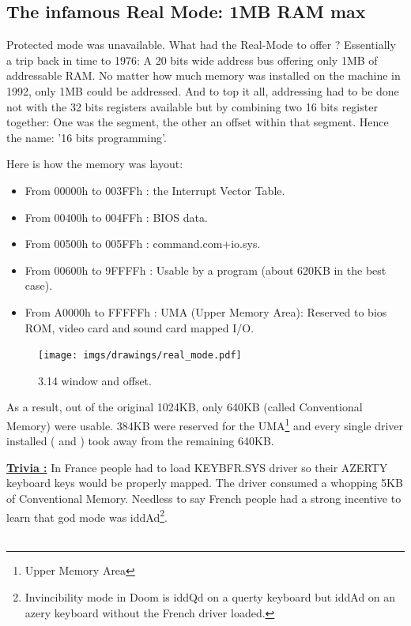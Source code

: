 \documentclass[book.tex]{subfiles}
\begin{document}
  \subsection{The infamous Real Mode: 1MB RAM max}
  Protected mode was unavailable. What had the Real-Mode to offer ? Essentially a trip back in time to 1976: A 20 bits wide address bus offering only 1MB of addressable RAM. No matter how much memory was installed on the machine in 1992, only 1MB could be addressed. And to top it all, addressing had to be done not with the 32 bits registers available but by combining two 16 bits register together: One was the segment, the other an offset within that segment. Hence the name: '16 bits programming'.

  \bigskip
Here is how the memory was layout: \\
\begin{itemize}
\item From 00000h to 003FFh : the Interrupt Vector Table.
\item From 00400h to 004FFh : BIOS data.
\item From 00500h to 005FFh : command.com+io.sys.
\item From 00600h to 9FFFFh : Usable by a program (about 620KB in the best case). 
\item From A0000h to FFFFFh : UMA (Upper Memory Area): Reserved to bios ROM, video card and sound card mapped I/O.
\end{itemize}

\begin{figure}[H]
\centering
\texttt{[image: imgs/drawings/real\_mode.pdf]}

\caption{3.14 window and offset.}
\label{fig:fp_internals}
\end{figure}


As a result, out of the original 1024KB, only 640KB (called Conventional Memory) were usable. 384KB were reserved for the UMA\footnote{Upper Memory Area} and every single driver installed ( and )  took away from the remaining 640KB.

\bigskip

\textbf{\underline{Trivia :}}  In France people had to load KEYBFR.SYS driver so their AZERTY keyboard keys would be properly mapped. The driver consumed a whopping 5KB of Conventional Memory. Needless to say French people had a strong incentive to learn that god mode was iddAd\footnote{Invincibility mode in Doom is iddQd on a querty keyboard but iddAd on an azery keyboard without the French driver loaded.}.\\
\\
\end{document}
